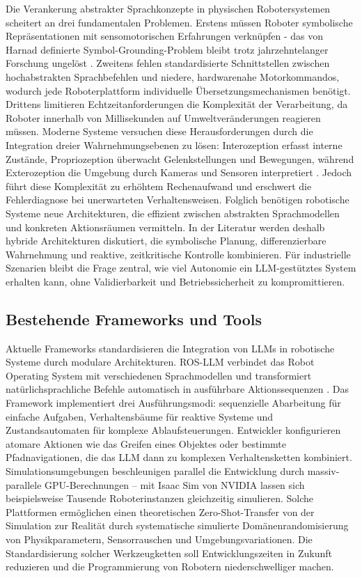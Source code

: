 Die Verankerung abstrakter Sprachkonzepte in physischen Robotersystemen
scheitert an drei fundamentalen Problemen. Erstens müssen Roboter symbolische
Repräsentationen mit sensomotorischen Erfahrungen verknüpfen - das von Harnad
definierte Symbol-Grounding-Problem bleibt trotz jahrzehntelanger Forschung
ungelöst . Zweitens fehlen standardisierte
Schnittstellen zwischen hochabstrakten Sprachbefehlen und niedere, hardwarenahe
Motorkommandos, wodurch jede Roboterplattform individuelle
Übersetzungsmechanismen benötigt. Drittens limitieren Echtzeitanforderungen die
Komplexität der Verarbeitung, da Roboter innerhalb von Millisekunden auf
Umweltveränderungen reagieren müssen. Moderne Systeme versuchen diese
Herausforderungen durch die Integration dreier Wahrnehmungsebenen zu lösen:
Interozeption erfasst interne Zustände, Propriozeption überwacht
Gelenkstellungen und Bewegungen, während Exterozeption die Umgebung durch
Kameras und Sensoren interpretiert . Jedoch führt
diese Komplexität zu erhöhtem Rechenaufwand und erschwert die Fehlerdiagnose bei
unerwarteten Verhaltensweisen. Folglich benötigen robotische Systeme neue
Architekturen, die effizient zwischen abstrakten Sprachmodellen und konkreten
Aktionsräumen vermitteln. In der Literatur werden deshalb hybride Architekturen
diskutiert, die symbolische Planung, differenzierbare Wahrnehmung und reaktive,
zeitkritische Kontrolle kombinieren. Für industrielle Szenarien bleibt die Frage
zentral, wie viel Autonomie ein LLM-gestütztes System erhalten kann, ohne
Validierbarkeit und Betriebssicherheit zu kompromittieren.

\subsection{Bestehende Frameworks und Tools}

Aktuelle Frameworks standardisieren die Integration von LLMs in robotische
Systeme durch modulare Architekturen. ROS-LLM verbindet das Robot Operating
System mit verschiedenen Sprachmodellen und transformiert natürlichsprachliche
Befehle automatisch in ausführbare Aktionssequenzen .
Das Framework implementiert drei Ausführungsmodi: sequenzielle Abarbeitung für
einfache Aufgaben, Verhaltensbäume für reaktive Systeme und Zustandsautomaten
für komplexe Ablaufsteuerungen. Entwickler konfigurieren atomare Aktionen wie
das Greifen eines Objektes oder bestimmte Pfadnavigationen, die das LLM dann zu
komplexen Verhaltensketten kombiniert. Simulationsumgebungen beschleunigen
parallel die Entwicklung durch massiv-parallele GPU-Berechnungen – mit Isaac Sim
von NVIDIA lassen sich beispielsweise Tausende Roboterinstanzen gleichzeitig
simulieren. Solche Plattformen
ermöglichen einen theoretischen
Zero-Shot-Transfer von der Simulation zur Realität durch systematische
simulierte Domänenrandomisierung von Physikparametern, Sensorrauschen und
Umgebungsvariationen. Die Standardisierung solcher
Werkzeugketten soll Entwicklungszeiten in Zukunft reduzieren und die
Programmierung von
Robotern niederschwelliger machen.

